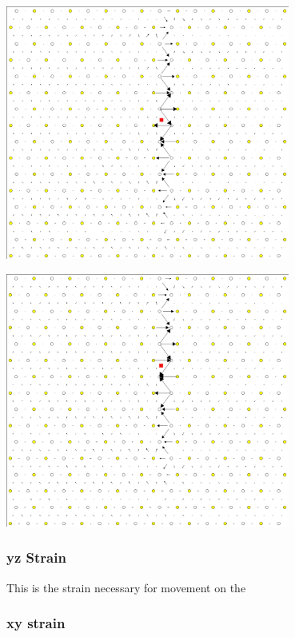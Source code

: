 \documentclass[11pt]{article}
\begin{document}
\begin{center}
\includegraphics[width=0.7\textwidth]{Images/final_model_peierls_xz_initial.png}
\end{center}
\begin{center}
\includegraphics[width=0.7\textwidth]{Images/final_model_peierls_xz_final_0.0012.png}
\end{center}




\subsubsection{yz Strain}
\label{sec:org255a220}

This is the strain necessary for movement on the 

\subsubsection{xy strain}
\label{sec:org4398a4c}
\end{document}
